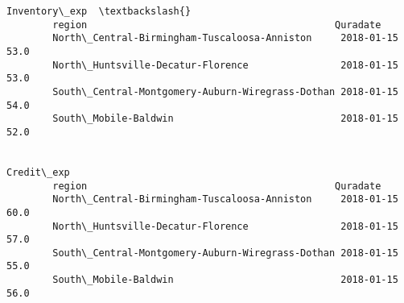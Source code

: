 \documentclass[11pt]{article}
\begin{document}
\begin{Verbatim}[commandchars=\\\{\}]
                                                                     Inventory\_exp  \textbackslash{}
        region                                           Quradate                    
        North\_Central-Birmingham-Tuscaloosa-Anniston     2018-01-15           53.0   
        North\_Huntsville-Decatur-Florence                2018-01-15           53.0   
        South\_Central-Montgomery-Auburn-Wiregrass-Dothan 2018-01-15           54.0   
        South\_Mobile-Baldwin                             2018-01-15           52.0   
        
                                                                     Credit\_exp  
        region                                           Quradate                
        North\_Central-Birmingham-Tuscaloosa-Anniston     2018-01-15        60.0  
        North\_Huntsville-Decatur-Florence                2018-01-15        57.0  
        South\_Central-Montgomery-Auburn-Wiregrass-Dothan 2018-01-15        55.0  
        South\_Mobile-Baldwin                             2018-01-15        56.0  
\end{Verbatim}
            
\end{document}
